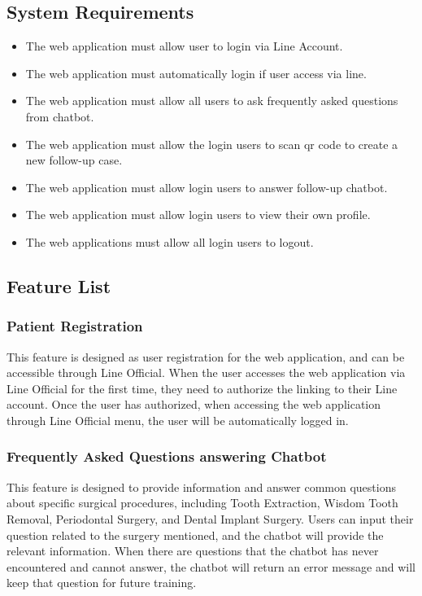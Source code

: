 \documentclass[12pt,oneside,openright,a4paper]{cpe-english-project}
\begin{document}
    \subsection{System Requirements}
    \begin{itemize}
      \item The web application must allow user to login via Line Account.
      \item The web application must automatically login if user access via line.
      \item The web application must allow all users to ask frequently asked questions from chatbot.
      \item The web application must allow the login users to scan qr code to create a new follow-up case.
      \item The web application must allow login users to answer follow-up chatbot.
      \item The web application must allow login users to view their own profile.
      \item The web applications must allow all login users to logout.
    \end{itemize}

    \subsection{Feature List}
      \subsubsection{Patient Registration}
      \qquad This feature is designed as user registration for the web application, and can be accessible through Line Official. When the user accesses the web application via Line Official for the first time, they need to authorize the linking to their Line account. Once the user has authorized, when accessing the web application through Line Official menu, the user will be automatically logged in. \par
      \subsubsection{Frequently Asked Questions answering Chatbot}
      \qquad This feature is designed to provide information and answer common questions about specific surgical procedures, including Tooth Extraction, Wisdom Tooth Removal, Periodontal Surgery, and Dental Implant Surgery. Users can input their question related to the surgery mentioned, and the chatbot will provide the relevant information. When there are questions that the chatbot has never encountered and cannot answer, the chatbot will return an error message and will keep that question for future training. \par
\end{document}
